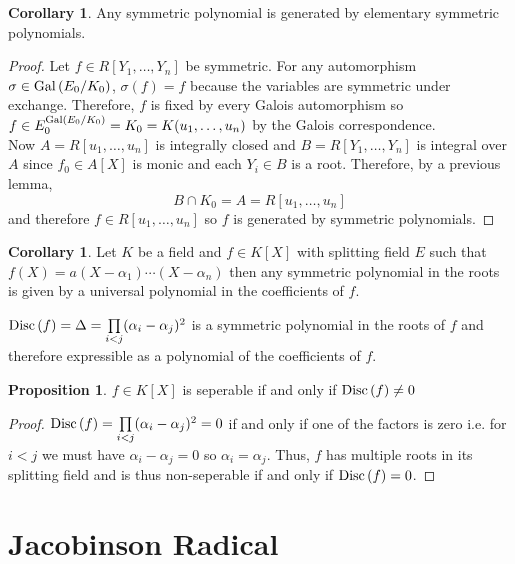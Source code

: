 \documentclass[12pt]{extarticle}
\theoremstyle{definition}
\newtheorem{proposition}[theorem]{Proposition}
\newtheorem{corollary}[theorem]{Corollary}
\newenvironment{definition}[1][Definition:]{\begin{trivlist}
\item[\hskip \labelsep {\bfseries #1}]}{\end{trivlist}}
\begin{document}
\begin{corollary}
Any symmetric polynomial is generated by elementary symmetric polynomials.
\end{corollary}

\begin{proof}
Let $f \in R[Y_1, \dots, Y_n]$ be symmetric. For any automorphism $\sigma \in \mathrm{Gal}\left( E_0/K_0 \right)$, $\sigma(f) = f$ because the variables are symmetric under exchange. Therefore, $f$ is fixed by every Galois automorphism so $f \in E_0^{\mathrm{Gal}\left( E_0/K_0 \right)} = K_0 = K(u_1, \dots, u_n)$ by the Galois correspondence.
\bigskip\\
Now $A = R[u_1, \dots, u_n]$ is integrally closed and $B = R[Y_1, \dots, Y_n]$ is integral over $A$ since $f_0 \in A[X]$ is monic and each $Y_i \in B$ is a root. Therefore, by a previous lemma,
\[ B \cap K_0 = A = R[u_1, \dots, u_n] \]
and therefore $f \in R[u_1, \dots, u_n]$ so $f$ is generated by symmetric polynomials.
\end{proof}

\begin{corollary}
Let $K$ be a field and $f \in K[X]$ with splitting field $E$ such that $f(X) = a(X - \alpha_1) \cdots (X - \alpha_n)$ then any symmetric polynomial in the roots is given by a universal polynomial in the coefficients of $f$.  
\end{corollary}

\begin{definition}
$\mathrm{Disc}\left( f \right) = \Delta = \prod\limits_{i < j} (\alpha_i - \alpha_j)^2$ is a symmetric polynomial in the roots of $f$ and therefore expressible as a polynomial of the coefficients of $f$. 
\end{definition}

\begin{proposition}
$f \in K[X]$ is seperable if and only if $\mathrm{Disc}\left( f \right) \neq 0$
\end{proposition}

\begin{proof}
$\mathrm{Disc}\left( f \right) = \prod\limits_{i < j} (\alpha_i - \alpha_j)^2 = 0$ if and only if one of the factors is zero i.e. for $i < j$ we must have $\alpha_i - \alpha_j = 0$ so $\alpha_i = \alpha_j$. Thus, $f$ has multiple roots in its splitting field and is thus non-seperable if and only if $\mathrm{Disc}\left( f \right) = 0$. 
\end{proof}





\section{Jacobinson Radical}
\end{document}
